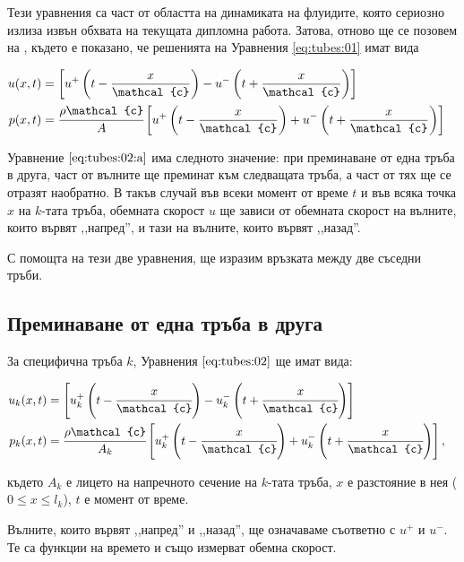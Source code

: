 \documentclass[main.tex]{subfiles}
\begin{document}
Тези уравнения са част от областта на динамиката на флуидите, която сериозно излиза извън обхвата на текущата дипломна работа. Затова, отново ще се позовем на \cite{rabiner_schafer78}, където е показано, че решенията на Уравнения \ref{eq:tubes:01} имат вида

\begin{subequations}
    \label{eq:tubes:02}
    \begin{flalign}
        \label{eq:tubes:02:a} u(x, t) & = \Q{u^+\B{t - \frac{x}{\mathcal{c}}} - u^-\B{t + \frac{x}{\mathcal{c}}}} && \\
        p(x, t) & = \cfrac{\rho \mathcal{c}}{A}\Q{u^+\B{t - \frac{x}{\mathcal{c}}} + u^-\B{t + \frac{x}{\mathcal{c}}}} &&
    \end{flalign}
\end{subequations}

Уравнение $\eqref{eq:tubes:02:a}$ има следното значение: при преминаване от една тръба в друга, част от вълните ще преминат към следващата тръба, а част от тях ще се отразят наобратно.
В такъв случай във всеки момент от време $t$ и във всяка точка $x$ на $k$-тата тръба, обемната скорост $u$ ще зависи от обемната скорост на вълните, които вървят ,,напред'', и тази на вълните, които вървят ,,назад''.

С помощта на тези две уравнения, ще изразим връзката между две съседни тръби.

\subsection{Преминаване от една тръба в друга}
За специфична тръба $k$, Уравнения $\eqref{eq:tubes:02}$ ще имат вида:

\begin{subequations}
    \label{eq:tubes:03}
    \begin{flalign}
        \label{eq:tubes:03:a} u_{k}(x, t) &= \Q{u_{k}^{+}\B{t - \cfrac{x}{\mathcal{c}}} - u_{k}^{-}\B{t + \cfrac{x}{\mathcal{c}}}} && \\
        p_{k}(x, t) &= \cfrac{\rho \mathcal{c}}{A_{k}} \Q{u_{k}^{+}\B{t - \cfrac{x}{\mathcal{c}}} + u_{k}^{-}\B{t + \cfrac{x}{\mathcal{c}}}},&&
    \end{flalign}
\end{subequations}

където $A_k$ е лицето на напречното сечение на $k$-тата тръба, $x$ е разстояние в нея ($0\leq x \leq l_k$), $t$ е момент от време.

Вълните, които вървят ,,напред'' и ,,назад'', ще означаваме съответно с $u^{+}$ и $u^{-}$. Те са функции на времето и също измерват обемна скорост.
\end{document}
